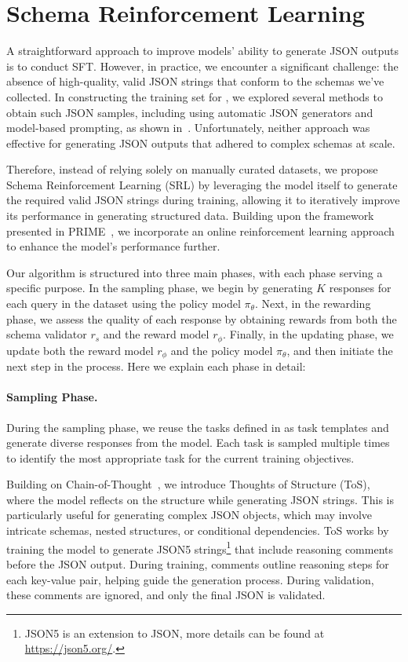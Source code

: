 

\section{Schema Reinforcement Learning}\label{sec:method}

A straightforward approach to improve models' ability to generate JSON outputs is to conduct SFT. 
However, in practice, we encounter a significant challenge: the absence of high-quality, valid JSON strings that conform to the schemas we’ve collected. 
In constructing the training set for \ourbench, we explored several methods to obtain such JSON samples, including using automatic JSON generators and model-based prompting, as shown in~. 
Unfortunately, neither approach was effective for generating JSON outputs that adhered to complex schemas at scale.


Therefore, instead of relying solely on manually curated datasets, we propose Schema Reinforcement Learning (SRL) by leveraging the model itself to generate the required valid JSON strings during training, allowing it to iteratively improve its performance in generating structured data.
Building upon the framework presented in PRIME~\citep{cui2025processreinforcementimplicitrewards}, we incorporate an online reinforcement learning approach to enhance the model’s performance further. 

Our algorithm is structured into three main phases, with each phase serving a specific purpose.
In the sampling phase, we begin by generating $K$ responses for each query in the dataset using the policy model $\pi_\theta$.
Next, in the rewarding phase, we assess the quality of each response by obtaining rewards from both the schema validator $r_s$ and the reward model $r_\phi$.
Finally, in the updating phase, we update both the reward model $r_\phi$ and the policy model $\pi_\theta$, and then initiate the next step in the process.
Here we explain each phase in detail:


\paragraph{Sampling Phase.}
During the sampling phase, we reuse the tasks defined in \ourbench as task templates and generate diverse responses from the model. Each task is sampled multiple times to identify the most appropriate task for the current training objectives.

Building on Chain-of-Thought~\citep{wei2023chainofthought}, we introduce Thoughts of Structure (ToS), where the model reflects on the structure while generating JSON strings. This is particularly useful for generating complex JSON objects, which may involve intricate schemas, nested structures, or conditional dependencies.
ToS works by training the model to generate JSON5 strings\footnote{JSON5 is an extension to JSON, more details can be found at \url{https://json5.org/}.} that include reasoning comments before the JSON output. During training, comments outline reasoning steps for each key-value pair, helping guide the generation process. During validation, these comments are ignored, and only the final JSON is validated.

